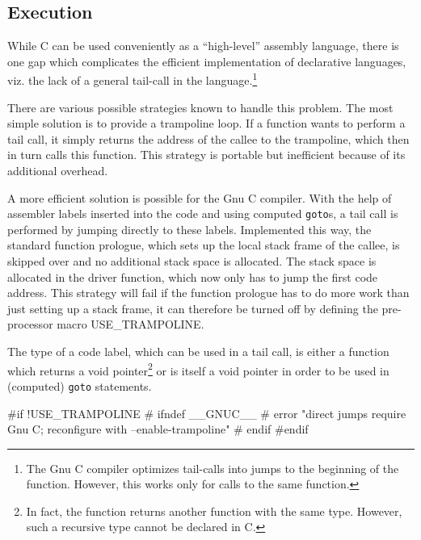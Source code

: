 %
%
\subsection{Execution}\label{sec:execution}
While C can be used conveniently as a ``high-level'' assembly
language, there is one gap which complicates the efficient
implementation of declarative languages, viz. the lack of a general
tail-call in the language.\footnote{The Gnu C compiler optimizes
tail-calls into jumps to the beginning of the function. However,
this works only for calls to the same function.}

There are various possible strategies known to handle this
problem. The most simple solution is to provide a trampoline loop. If
a function wants to perform a tail call, it simply returns the address
of the callee to the trampoline, which then in turn calls this
function. This strategy is portable but inefficient because of its
additional overhead.

A more efficient solution is possible for the Gnu C compiler. With the
help of assembler labels inserted into the code and using computed
\texttt{goto}s, a tail call is performed by jumping directly to these
labels. Implemented this way, the standard function prologue, which
sets up the local stack frame of the callee, is skipped over and no
additional stack space is allocated. The stack space is allocated in
the driver function, which now only has to jump the first code
address. This strategy will fail if the function prologue has to do
more work than just setting up a stack frame, it can therefore be
turned off by defining the pre-processor macro {\Tt{}USE{\_}TRAMPOLINE\nwendquote}.

The type of a code label, which can be used in a tail call, is either
a function which returns a {\Tt{}void\nwendquote} pointer\footnote{In fact, the
function returns another function with the same type. However, such a
recursive type cannot be declared in C.} or is itself a {\Tt{}void\nwendquote}
pointer in order to be used in (computed) \texttt{goto} statements.

\nwenddocs{}\endmoddef\nwstartdeflinemarkup{}\nwenddeflinemarkup
#if !USE_TRAMPOLINE
# ifndef __GNUC__
#  error "direct jumps require Gnu C; reconfigure with --enable-trampoline"
# endif
#endif

